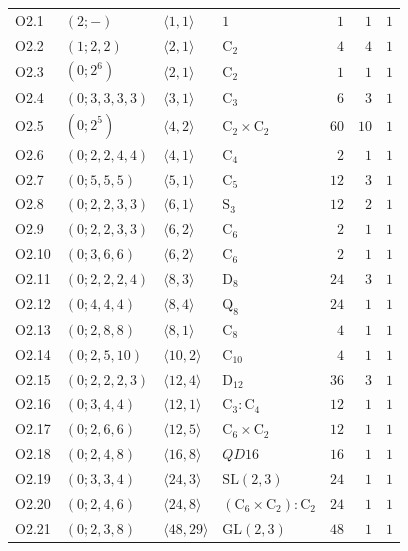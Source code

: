 \begin{center}
\begin{longtable}{|l|l|l|l|r|r|r|}
O2.1 & $(2; -)$ & $\langle 1, 1 \rangle$ & {\small $1$} & $1$ & $1$ & $1$ \\
O2.2 & $(1; 2, 2)$ & $\langle 2, 1 \rangle$ & {\small $\mathrm{C}_{2}$} & $4$ & $4$ & $1$ \\
O2.3 & $(0; 2^6)$ & $\langle 2, 1 \rangle$ & {\small $\mathrm{C}_{2}$} & $1$ & $1$ & $1$ \\
O2.4 & $(0; 3, 3, 3, 3)$ & $\langle 3, 1 \rangle$ & {\small $\mathrm{C}_{3}$} & $6$ & $3$ & $1$ \\
O2.5 & $(0; 2^5)$ & $\langle 4, 2 \rangle$ & {\small $\mathrm{C}_{2} \times \mathrm{C}_{2}$} & $60$ & $10$ & $1$ \\
O2.6 & $(0; 2, 2, 4, 4)$ & $\langle 4, 1 \rangle$ & {\small $\mathrm{C}_{4}$} & $2$ & $1$ & $1$ \\
O2.7 & $(0; 5, 5, 5)$ & $\langle 5, 1 \rangle$ & {\small $\mathrm{C}_{5}$} & $12$ & $3$ & $1$ \\
O2.8 & $(0; 2, 2, 3, 3)$ & $\langle 6, 1 \rangle$ & {\small $\mathrm{S}_{3}$} & $12$ & $2$ & $1$ \\
O2.9 & $(0; 2, 2, 3, 3)$ & $\langle 6, 2 \rangle$ & {\small $\mathrm{C}_{6}$} & $2$ & $1$ & $1$ \\
O2.10 & $(0; 3, 6, 6)$ & $\langle 6, 2 \rangle$ & {\small $\mathrm{C}_{6}$} & $2$ & $1$ & $1$ \\
O2.11 & $(0; 2, 2, 2, 4)$ & $\langle 8, 3 \rangle$ & {\small $ \mathrm{D}_{8}$} & $24$ & $3$ & $1$ \\
O2.12 & $(0; 4, 4, 4)$ & $\langle 8, 4 \rangle$ & {\small $ \mathrm{Q}_{8}$} & $24$ & $1$ & $1$ \\
O2.13 & $(0; 2, 8, 8)$ & $\langle 8, 1 \rangle$ & {\small $\mathrm{C}_{8}$} & $4$ & $1$ & $1$ \\
O2.14 & $(0; 2, 5, 10)$ & $\langle 10, 2 \rangle$ & {\small $\mathrm{C}_{10}$} & $4$ & $1$ & $1$ \\
O2.15 & $(0; 2, 2, 2, 3)$ & $\langle 12, 4 \rangle$ & {\small $ \mathrm{D}_{12}$} & $36$ & $3$ & $1$ \\
O2.16 & $(0; 3, 4, 4)$ & $\langle 12, 1 \rangle$ & {\small $\mathrm{C}_{3} \colon \mathrm{C}_{4}$} & $12$ & $1$ & $1$ \\
O2.17 & $(0; 2, 6, 6)$ & $\langle 12, 5 \rangle$ & {\small $\mathrm{C}_{6} \times \mathrm{C}_{2}$} & $12$ & $1$ & $1$ \\
O2.18 & $(0; 2, 4, 8)$ & $\langle 16, 8 \rangle$ & {\small $QD16$} & $16$ & $1$ & $1$ \\
O2.19 & $(0; 3, 3, 4)$ & $\langle 24, 3 \rangle$ & {\small $\mathrm{SL}(2,3)$} & $24$ & $1$ & $1$ \\
O2.20 & $(0; 2, 4, 6)$ & $\langle 24, 8 \rangle$ & {\small $(\mathrm{C}_{6} \times \mathrm{C}_{2}) \colon \mathrm{C}_{2}$} & $24$ & $1$ & $1$ \\
O2.21 & $(0; 2, 3, 8)$ & $\langle 48, 29 \rangle$ & {\small $\mathrm{GL}(2,3)$} & $48$ & $1$ & $1$ \\
\end{longtable}
\end{center}
%
